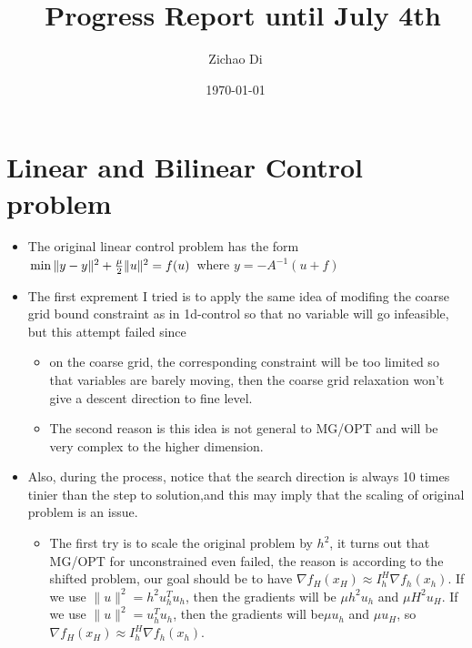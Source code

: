 \documentclass[10pt]{article}
\title{\ Progress Report until July 4th}
\author{Zichao Di}
\date{\today}
\begin{document}
  \maketitle 

\section{Linear and Bilinear Control problem}
\begin{itemize}
\item The original linear control problem has the form $\min \|y-y_{\*}\|^2+\frac{\mu}{2}\|u\|^2=f(u)$ where $y=-A^{-1}(u+f)$
\item The first exprement I tried is to apply the same idea of modifing the coarse grid bound constraint as in 1d-control so that no variable will go infeasible, but this attempt failed since 
\begin{itemize}
\item on the coarse grid, the corresponding constraint will be too limited so that variables are barely moving, then the coarse grid relaxation won't give a descent direction to fine level.
\item The second reason is this idea is not general to MG/OPT and will be very complex to the higher dimension.
\end{itemize}
\item Also, during the process, notice that the search direction is always 10 times tinier than the step to solution,and  this may imply that the scaling of original problem is an issue.
\begin{itemize}
\item The first try is to scale the original problem by $h^2$, it turns out that MG/OPT for unconstrained even failed, the reason is according to the shifted problem, our goal should be to have $\nabla f_{H}(x_{H})\approx I_{h}^{H}\nabla f_{h}(x_{h})$. If we use $\|u\|^2=h^{2}u_{h}^{T}u_{h}$, then the gradients will be $\mu h^{2}u_{h}$ and $\mu H^{2}u_{H}$. If we use $\|u\|^2=u_{h}^{T}u_{h}$, then the gradients will be$\mu u_{h}$ and $\mu u_{H}$, so $\nabla f_{H}(x_{H})\approx I_{h}^{H}\nabla f_{h}(x_{h})$.
\begin{figure}[h]
\centering
  \\

\end{figure}
\end{itemize}
\end{itemize}
\end{document}
